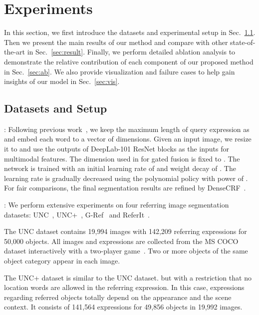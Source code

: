 \documentclass[10pt,twocolumn,letterpaper]{article}
\begin{document}
 

\section{Experiments}\label{sec:experiment}
In this section, we first introduce the datasets and experimental setup in Sec.~\ref{sec:dataset}. Then we present the main results of our method and compare with other state-of-the-art in Sec.~\ref{sec:result}. Finally, we perform detailed ablation analysis to demonstrate the relative contribution of each component of our proposed method in Sec.~\ref{sec:ab}. We also provide  visualization and failure cases to help gain insights of our model in Sec.~\ref{sec:vis}.

\subsection{Datasets and Setup}\label{sec:dataset}

: Following previous work~\cite{li2018referring,liu2017recurrent, shi2018key}, we keep the maximum length of query expression as  and embed each word to a vector of  dimensions. Given an input image, we resize it to  and use the outputs of DeepLab-101 ResNet blocks  as the inputs for multimodal features. The dimension used in  for gated fusion is fixed to .
The network is trained with 
an initial learning rate of  and weight decay of . The learning rate is gradually decreased using the polynomial policy with power of . For fair comparisons, the final segmentation results are refined by DenseCRF~\cite{krahenbuhl2011efficient}.

: We perform extensive experiments on four referring image segmentation datasets: UNC~\cite{yu2016modeling}, UNC+~\cite{yu2016modeling}, G-Ref~\cite{mao2016generation} and ReferIt~\cite{kazemzadeh2014referitgame}.

The UNC dataset contains 19,994 images with 142,209 referring expressions for 50,000 objects. All images and expressions are collected from the MS COCO~\cite{lin2014microsoft} dataset interactively with a two-player game~\cite{kazemzadeh2014referitgame}. Two or more objects of the same object category appear in each image. 

The UNC+ dataset is similar to the UNC dataset. but with a restriction that no location words are allowed in the referring expression. In this case, expressions regarding referred objects totally depend on the appearance and the scene context. It consists of 141,564 expressions for 49,856 objects in 19,992 images.
\end{document}
